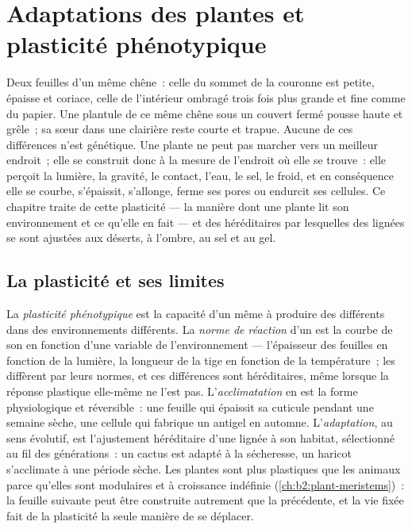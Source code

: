 \chapter{Adaptations des plantes et plasticité phénotypique}\label{ch:b2:plant-plasticity}

Deux feuilles d'un même chêne~: celle du sommet de la couronne est
petite, épaisse et coriace, celle de l'intérieur ombragé trois fois plus
grande et fine comme du papier. Une plantule de ce même chêne sous un
couvert fermé pousse haute et grêle~; sa sœur dans une clairière reste
courte et trapue. Aucune de ces différences n'est génétique. Une plante
ne peut pas marcher vers un meilleur endroit~; elle se construit donc à
la mesure de l'endroit où elle se trouve~: elle perçoit la lumière, la
gravité, le contact, l'eau, le sel, le froid, et en conséquence elle se
courbe, s'épaissit, s'allonge, ferme ses pores ou endurcit ses
cellules. Ce chapitre traite de cette plasticité --- la manière dont une
plante lit son environnement et ce qu'elle en fait --- et des
 héréditaires par lesquelles des lignées se sont ajustées
aux déserts, à l'ombre, au sel et au gel.

\section{La plasticité et ses limites}

\begin{definition}\label{def:b2:plant-plasticity:plasticity}
La \emph{plasticité phénotypique} est la capacité d'un même  à
produire des  différents dans des environnements différents.
La \emph{norme de réaction} d'un  est la courbe de son 
en fonction d'une variable de l'environnement --- l'épaisseur des
feuilles en fonction de la lumière, la longueur de la tige en fonction
de la température~; les  diffèrent par leurs normes, et ces
différences sont héréditaires, même lorsque la réponse plastique
elle-même ne l'est pas. L'\emph{acclimatation} en est la forme
physiologique et réversible~: une feuille qui épaissit sa cuticule
pendant une semaine sèche, une cellule qui fabrique un antigel en
automne. L'\emph{adaptation}, au sens évolutif, est l'ajustement
héréditaire d'une lignée à son habitat, sélectionné au fil des
générations~: un cactus est adapté à la sécheresse, un haricot
s'acclimate à une période sèche. Les plantes sont plus plastiques que
les animaux parce qu'elles sont modulaires et à croissance indéfinie
(\cref{ch:b2:plant-meristems})~: la feuille suivante peut être
construite autrement que la précédente, et la vie fixée fait de la
plasticité la seule manière de se déplacer.
\end{definition}

